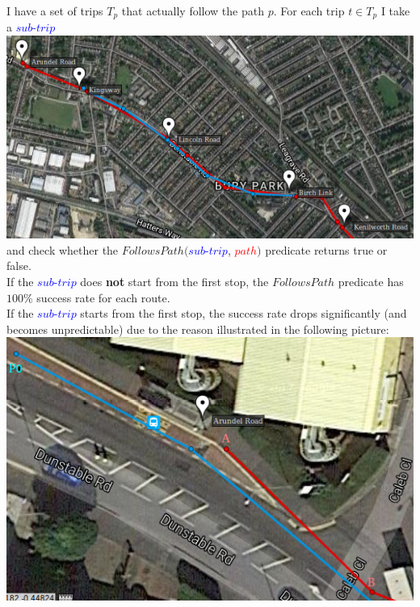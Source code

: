 \documentclass[12pt,a4paper,oneside,openright]{report}
\begin{document}
I have a set of trips $T_p$ that actually follow the path $p$.
For each trip $t \in T_p$ I take a \textcolor{blue}{$sub$-$trip$} \\
\includegraphics[scale = 0.7]{figs/stop1.png} \\

and check whether the
$FollowsPath($\textcolor{blue}{$sub$-$trip$}, \textcolor{red}{$path$}$)$ 
predicate returns true or false. \\

If the \textcolor{blue}{$sub$-$trip$} does \textbf{not} start from the 
first stop, the $FollowsPath$ predicate has $100\%$ success rate 
for each route. \\

If the \textcolor{blue}{$sub$-$trip$} starts from the first stop,
the success rate drops significantly (and becomes unpredictable) due to 
the reason illustrated in the following picture: \\

\includegraphics[scale = 0.7]{figs/stop0.png} \\
\end{document}
